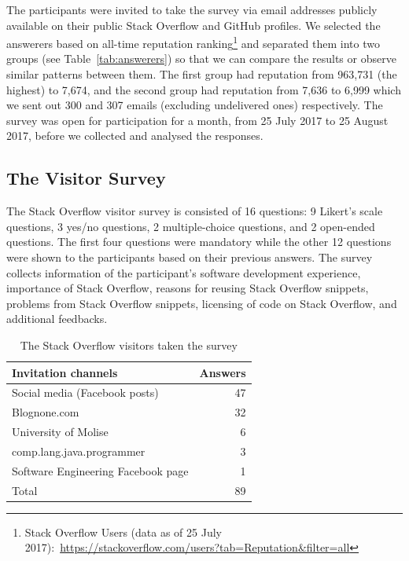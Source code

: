 \documentclass{svjour3}                     %
\begin{document}
The participants were invited to take the survey via email addresses publicly available on their
public Stack Overflow and GitHub profiles. We selected the answerers based on
all-time reputation ranking\footnote{Stack Overflow Users (data as of 25 July
	2017):~\url{https://stackoverflow.com/users?tab=Reputation&filter=all}} and
separated them into two groups (see Table~\ref{tab:answerers}) so that we can
compare the results or observe similar patterns between them. 
The first group had reputation from 963,731 (the
highest) to 7,674, and the second group had reputation from 7,636 to 6,999 which
we sent out 300 and 307 emails (excluding undelivered ones) respectively. The
survey was open for participation for a month, from 25 July 2017 to 25 August
2017, before we collected and analysed the responses.

\subsection{The Visitor Survey}

The Stack Overflow visitor survey is consisted of 16 questions: 9 Likert's scale
questions, 3 yes/no questions, 2 multiple-choice questions, and 2 open-ended
questions. The first four questions were mandatory while the other 12 questions
were shown to the participants based on their previous answers. The survey collects
information of the participant's software development experience, importance of
Stack Overflow, reasons for reusing Stack Overflow snippets, problems from
Stack Overflow snippets, licensing of code on Stack Overflow, and additional
feedbacks.

\begin{table}
	\centering
	\caption{The Stack Overflow visitors taken the survey}
	\label{tab:visitors}
	\begin{tabular}{lr}
		\toprule
		Invitation channels & Answers \\
		\midrule
		Social media (Facebook posts) & 47 \\
		Blognone.com & 32 \\
		University of Molise & 6 \\
		comp.lang.java.programmer & 3 \\
		Software Engineering Facebook page & 1 \\
		\midrule
		Total & 89 \\
		\bottomrule
	\end{tabular}
\end{table}
\end{document}
